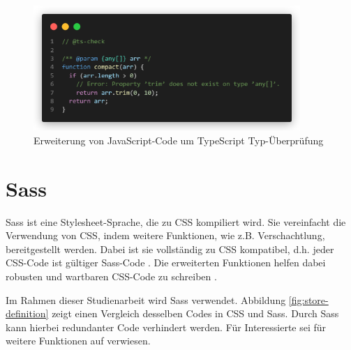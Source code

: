 \begin{figure}[H]
  \includegraphics[width=0.9\textwidth]{images/typescript-example-js.png}
  \centering
  \caption[Erweiterung von JavaScript-Code um TypeScript Typ-Überprüfung]{Erweiterung von JavaScript-Code um TypeScript Typ-Überprüfung}
  \label{fig:typescript-js}
\end{figure}

%
%
\section{Sass}
Sass ist eine Stylesheet-Sprache, die zu CSS kompiliert wird. Sie vereinfacht die Verwendung von CSS, indem weitere Funktionen, wie z.B. Verschachtlung, bereitgestellt werden. Dabei ist sie vollständig zu CSS kompatibel, d.h. jeder CSS-Code ist gültiger Sass-Code \cite[vgl.][]{SassDocs}. Die erweiterten Funktionen helfen dabei robusten und wartbaren CSS-Code zu schreiben \cite[vgl.][]{SassDocs}.

Im Rahmen dieser Studienarbeit wird Sass verwendet. Abbildung \ref{fig:store-definition} zeigt einen Vergleich desselben Codes in CSS und Sass. Durch Sass kann hierbei redundanter Code verhindert werden. Für Interessierte sei für weitere Funktionen auf \cite{SassGuide} verwiesen.


